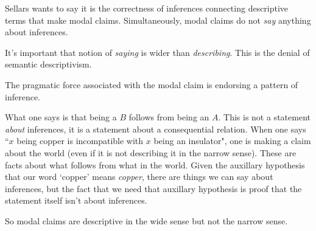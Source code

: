 Sellars wants to say it is the correctness of inferences connecting descriptive terms that make modal claims. Simultaneously, modal claims do not \emph{say} anything about inferences.

It's important that notion of \emph{saying} is wider than \emph{describing}. This is the denial of semantic descriptivism.

The pragmatic force associated with the modal claim is endorsing a pattern of inference.

What one says is that being a $B$ follows from being an $A$. This is not a statement \emph{about} inferences, it is a statement about a consequential relation. When one says ``$x$ being copper is incompatible with $x$ being an insulator", one is making a claim about the world (even if it is not describing it in the narrow sense). These are facts about what follows from what in the world. Given the auxillary hypothesis that our word `copper' means \emph{copper}, there are things we can say about inferences, but the fact that we need that auxillary hypothesis is proof that the statement itself isn't about inferences.

So modal claims are descriptive in the wide sense but not the narrow sense.



